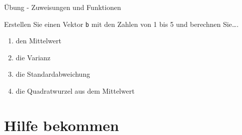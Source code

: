 \documentclass[ignorenonframetext,]{beamer}
\begin{document}
\begin{frame}[fragile]{Übung - Zuweisungen und Funktionen}

Erstellen Sie einen Vektor \texttt{b} mit den Zahlen von 1 bis 5 und
berechnen Sie\ldots{}.

\begin{enumerate}
\def\labelenumi{\arabic{enumi}.}
\item
  den Mittelwert
\item
  die Varianz
\item
  die Standardabweichung
\item
  die Quadratwurzel aus dem Mittelwert
\end{enumerate}

\end{frame}

\section{Hilfe bekommen}\label{hilfe-bekommen}
\end{document}
